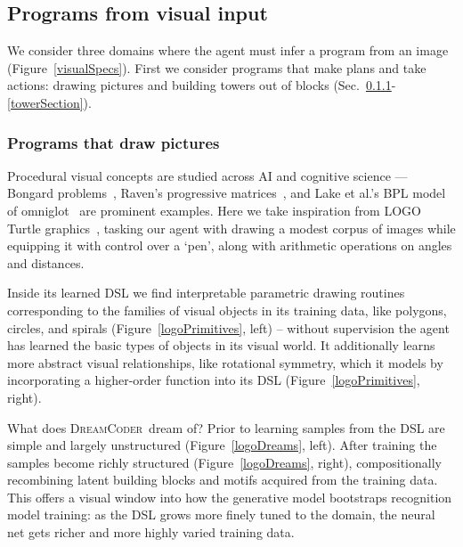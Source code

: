\documentclass{article}
\newcommand{\system}{\textsc{DreamCoder}~}
\newcommand{\code}[1]{{\footnotesize\texttt{#1}}}
\begin{document}
\subsection{Programs from visual input}
We consider three domains where the agent must infer a program from an
image (Figure~\ref{visualSpecs}).
First we consider programs that make plans and take actions:  drawing pictures and building towers out of blocks (Sec.~\ref{logoSection}-\ref{towerSection}).

\subsubsection{Programs that draw pictures}\label{logoSection}

Procedural visual concepts are studied across AI and cognitive science
--- Bongard problems~\cite{Moscow}, Raven's progressive
matrices~\cite{raven2003raven}, and Lake et al.'s BPL model of
omniglot~\cite{lake2015human} are prominent examples.  Here we take
inspiration from LOGO Turtle graphics~\cite{turtle}, tasking our agent
with drawing a modest corpus of images while equipping it with control
over a `pen', along with arithmetic operations on angles and
distances.

Inside its learned DSL we find interpretable parametric drawing
routines corresponding to the families of visual objects in its
training data, like polygons, circles, and spirals
(Figure~\ref{logoPrimitives}, left) -- without supervision the agent
has learned the basic types of objects in its visual world. It
additionally learns more abstract visual relationships, like
rotational symmetry, which it models by incorporating a higher-order
function into its DSL (Figure~\ref{logoPrimitives}, right).  %

What does \system dream of?  Prior to learning samples from the DSL
are simple and largely unstructured (Figure~\ref{logoDreams}, left).
After training the samples become richly structured
(Figure~\ref{logoDreams}, right), compositionally recombining latent
building blocks and motifs acquired from the training data. This
offers a visual window into how the generative model bootstraps recognition
model training: as the DSL grows more finely tuned to the domain, the
neural net gets richer and more highly varied training data.


\end{document}
